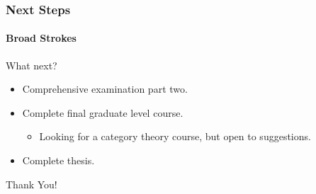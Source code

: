 \documentclass{beamer}
\begin{document}

\begin{frame}

\frametitle{Next Steps}
\framesubtitle{Broad Strokes}


\begin{Large}
What next?
\end{Large}

\begin{itemize}
\item Comprehensive examination part two.
\item Complete final graduate level course.
\begin{itemize}
\item Looking for a category theory course, but open to suggestions.
\end{itemize}
\item Complete thesis.
\end{itemize}
\end{frame}


\begin{frame}
\begin{center}
\Huge Thank You!
\end{center}
\end{frame}

\end{document}
